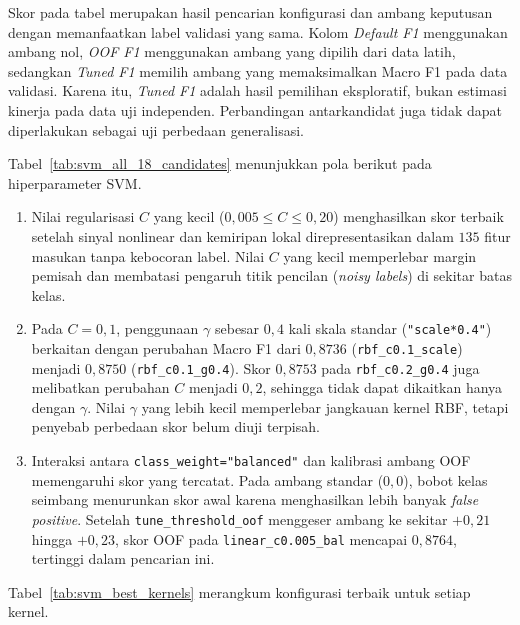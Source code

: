 Skor pada tabel merupakan hasil pencarian konfigurasi dan ambang keputusan dengan memanfaatkan label validasi yang sama. Kolom \textit{Default F1} menggunakan ambang nol, \textit{OOF F1} menggunakan ambang yang dipilih dari data latih, sedangkan \textit{Tuned F1} memilih ambang yang memaksimalkan Macro F1 pada data validasi. Karena itu, \textit{Tuned F1} adalah hasil pemilihan eksploratif, bukan estimasi kinerja pada data uji independen. Perbandingan antarkandidat juga tidak dapat diperlakukan sebagai uji perbedaan generalisasi.

Tabel~\ref{tab:svm_all_18_candidates} menunjukkan pola berikut pada hiperparameter SVM.
\begin{enumerate}
    \item Nilai regularisasi $C$ yang kecil ($0{,}005 \le C \le 0{,}20$) menghasilkan skor terbaik setelah sinyal nonlinear dan kemiripan lokal direpresentasikan dalam $135$ fitur masukan tanpa kebocoran label. Nilai $C$ yang kecil memperlebar margin pemisah dan membatasi pengaruh titik pencilan (\textit{noisy labels}) di sekitar batas kelas.
    \item Pada $C=0{,}1$, penggunaan $\gamma$ sebesar $0{,}4$ kali skala standar (\texttt{"scale*0.4"}) berkaitan dengan perubahan Macro F1 dari $0{,}8736$ (\texttt{rbf\_c0.1\_scale}) menjadi $0{,}8750$ (\texttt{rbf\_c0.1\_g0.4}). Skor $0{,}8753$ pada \texttt{rbf\_c0.2\_g0.4} juga melibatkan perubahan $C$ menjadi $0{,}2$, sehingga tidak dapat dikaitkan hanya dengan $\gamma$. Nilai $\gamma$ yang lebih kecil memperlebar jangkauan kernel RBF, tetapi penyebab perbedaan skor belum diuji terpisah.
    \item Interaksi antara \texttt{class\_weight="balanced"} dan kalibrasi ambang OOF memengaruhi skor yang tercatat. Pada ambang standar ($0{,}0$), bobot kelas seimbang menurunkan skor awal karena menghasilkan lebih banyak \textit{false positive}. Setelah \texttt{tune\_threshold\_oof} menggeser ambang ke sekitar $+0{,}21$ hingga $+0{,}23$, skor OOF pada \texttt{linear\_c0.005\_bal} mencapai $0{,}8764$, tertinggi dalam pencarian ini.
\end{enumerate}

Tabel~\ref{tab:svm_best_kernels} merangkum konfigurasi terbaik untuk setiap kernel.

